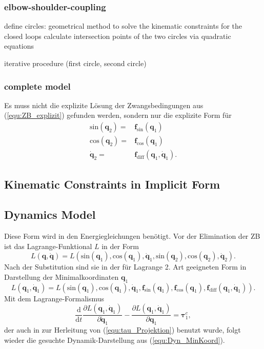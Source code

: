 \documentclass[letterpaper, 10 pt, conference]{ieeeconf}  %
\begin{document}
\subsubsection{elbow-shoulder-coupling}

define circles: geometrical method to solve the kinematic constraints for the closed loops
calculate intersection points of the two circles via quadratic equations 

iterative procedure (first circle, second circle)

\subsubsection{complete model}



Es muss nicht die explizite Lösung der Zwangsbedingungen aus (\ref{equ:ZB_explizit}) gefunden werden, sondern nur die explizite Form für 
%
\begin{align}
\mathrm{sin}(\bm{q}_2) =& \bm{f}_\mathrm{sin}(\bm{q}_1) \\
\mathrm{cos}(\bm{q}_2) =& \bm{f}_\mathrm{cos}(\bm{q}_1) \\
\dot{\bm{q}}_2 =& \bm{f}_\mathrm{diff}(\bm{q}_1,\dot{\bm{q}}_1).
\end{align}


\subsection{Kinematic Constraints in Implicit Form}



\subsection{Dynamics Model}

\label{sec:Lagrange2Elim}
%
Diese Form wird in den Energiegleichungen benötigt.
Vor der Elimination der ZB ist das Lagrange-Funktional $L$ in der Form
\begin{equation}
L(\bm{q},\dot{\bm{q}})=L(\mathrm{sin}(\bm{q}_1),\mathrm{cos}(\bm{q}_1),\dot{\bm{q}}_1,\mathrm{sin}(\bm{q}_2),\mathrm{cos}(\bm{q}_2),\dot{\bm{q}}_2).
\end{equation}
Nach der Substitution sind sie in der für Lagrange 2. Art geeigneten Form in Darstellung der Minimalkoordinaten $\bm{q}_1$
%
\begin{equation}
L(\bm{q}_1,\dot{\bm{q}}_1)=L(\mathrm{sin}(\bm{q}_1),\mathrm{cos}(\bm{q}_1),\dot{\bm{q}}_1,\bm{f}_\mathrm{sin}(\bm{q}_1),\bm{f}_\mathrm{cos}(\bm{q}_1), \bm{f}_\mathrm{diff}(\bm{q}_1,\dot{\bm{q}}_1)).
\end{equation}
%
Mit dem Lagrange-Formalismus
%
\begin{equation}
\frac{\mathrm{d}}{\mathrm{d}t}\frac{\partial L(\bm{q}_1,\dot{\bm{q}}_1)}{\partial \dot{\bm{q}}_1} - \frac{\partial L(\bm{q}_1,\dot{\bm{q}}_1)}{\partial \bm{q}_1} = \bm{\tau}^c_1,
\end{equation}
%
der auch in \cite{NakamuraGho1989} zur Herleitung von (\ref{equ:tau_Projektion}) benutzt wurde, folgt wieder die gesuchte Dynamik-Darstellung aus (\ref{equ:Dyn_MinKoord}).
\end{document}
